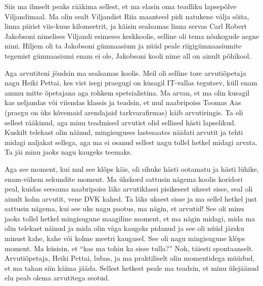 \label{sisu:asko}


Siis ma ilmselt peaks rääkima sellest, et ma  elasin oma teadliku lapsepõlve 
Viljandimaal. Ma olin sealt Viljandist Riia maanteed pidi natukene välja sõita, 
 linna piirist viis-kuus kilomeetrit, ja  käisin sealsamas linna servas Carl 
Robert Jakobsoni nimelises Viljandi esimeses keskkoolis, selline oli tema nõukogude aegne nimi. Hiljem oli ta Jakobsoni 
gümnaasium ja nüüd peale riigigümnaasiumite tegemist gümnaasiumi enam ei ole, 
Jakobsoni kooli nime all on ainult põhikool. 

Aga arvutiteni jõudsin ma sealsamas koolis. Meil oli selline tore arvutiõpetaja 
nagu Heiki Pettai, kes vist isegi praegugi on kusagil 
IT-vallas tegutsev, küll enam ammu mitte õpetajana aga rohkem  
spetsialistina. Ma arvan, et ma olin kusagil kas neljandas või viiendas 
klassis ja teadsin, et mul naabripoiss Toomas Aas (praegu on üks kõvemaid arendajaid tarkvarafirmas) käib 
 arvutiringis. Ta oli sellest 
rääkinud, aga minu teadmised arvutist olid sellised hästi  lapselikud. Kuskilt 
telekast olin näinud, mingisuguses lastesaates näidati arvutit ja 
tehti midagi naljakat sellega, aga ma ei osanud sellest nagu tollel hetkel 
midagi arvata. Ta jäi minu jaoks nagu kaugeks teemaks. 

Aga see moment, kui mul see klõps käis, oli sihuke hästi ootamatu ja hästi 
lühike, enam-vähem sekundite moment. Ma ükskord sattusin nägema koolis koridori 
peal, kuidas seesama naabripoiss läks  arvutiklassi  pisikesest uksest sisse, 
seal oli ainult kolm arvutit, vene DVK kahed. Ta läks 
 uksest sisse ja ma sellel hetkel just sattusin nägema, kui see uks nagu 
paotus, ma nägin, et arvutid! See oli minu jaoks tollel hetkel mingisugune 
maagiline moment, et ma nägin midagi, mida ma olin telekast näinud ja mida olin 
väga kaugeks pidanud ja see oli nüüd järsku minust kahe, kahe või kolme meetri 
kaugusel. See oli nagu mingisugune klõps moment. Ma küsisin, et \enquote{kas ma 
tohin ka sisse tulla?} Noh, täiesti spontaanselt. Arvutiõpetaja, Heiki Pettai,  
lubas, ja ma praktiliselt olin momentidega müüdud, et ma tahan siin käima 
jääda. Sellest hetkest peale ma teadsin, et minu ülejäänud elu peab olema 
arvutitega seotud. 


